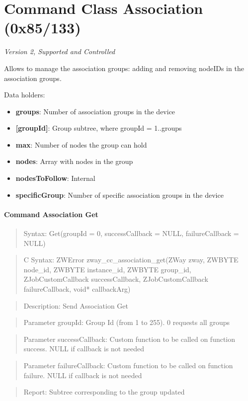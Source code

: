 \section{Command Class Association (0x85/133)}

\textit{Version 2, Supported and Controlled}
\newline

Allows to manage the association groups: adding and removing nodeIDs in the association groups.
\newline

\noindent
Data holders:

\begin{itemize}
\item \textbf{groups}: Number of association groups in the device
\item \textbf{[groupId]}: Group subtree, where groupId = 1..groups
\item \qquad\textbf{max}: Number of nodes the group can hold
\item \qquad\textbf{nodes}: Array with nodes in the group
\item \qquad\textbf{nodesToFollow}: Internal
\item \textbf{specificGroup}: Number of specific association groups in the device
\end{itemize}

\paragraph{Command Association Get}
\begin{quote}Syntax: Get(groupId = 0, successCallback = NULL, failureCallback = NULL)\end{quote}
\begin{quote}C Syntax: ZWError zway\_cc\_association\_get(ZWay zway, ZWBYTE node\_id, ZWBYTE instance\_id, ZWBYTE group\_id, ZJobCustomCallback successCallback, ZJobCustomCallback failureCallback, void* callbackArg)\end{quote}
\begin{quote}Description: Send Association Get\end{quote}
\begin{quote}Parameter groupId: Group Id (from 1 to 255). 0 requests all groups\end{quote}
\begin{quote}Parameter successCallback: Custom function to be called on function success. NULL if callback is not needed\end{quote}
\begin{quote}Parameter failureCallback: Custom function to be called on function failure. NULL if callback is not needed\end{quote}
\begin{quote}Report: Subtree corresponding to the group updated\end{quote}

